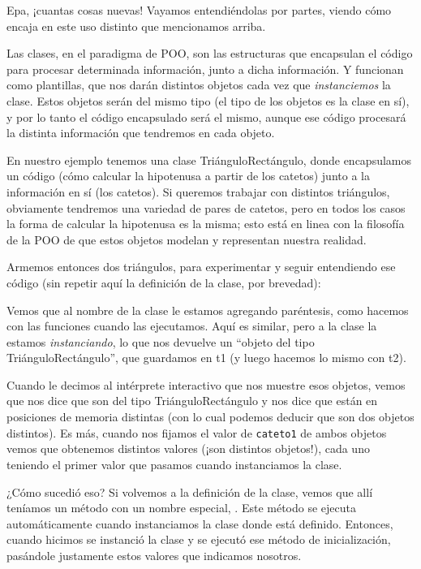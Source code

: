 
Epa, ¡cuantas cosas nuevas! Vayamos entendiéndolas por partes, viendo cómo encaja en este uso distinto que mencionamos arriba. 

Las clases, en el paradigma de POO, son las estructuras que encapsulan el código para procesar determinada información, junto a dicha información. Y funcionan como plantillas, que nos darán distintos objetos cada vez que \textit{instanciemos} la clase. Estos objetos serán del mismo tipo (el tipo de los objetos es la clase en sí), y por lo tanto el código encapsulado será el mismo, aunque ese código procesará la distinta información que tendremos en cada objeto.

En nuestro ejemplo tenemos una clase TriánguloRectángulo, donde encapsulamos un código (cómo calcular la hipotenusa a partir de los catetos) junto a la información en sí (los catetos). Si queremos trabajar con distintos triángulos, obviamente tendremos una variedad de pares de catetos, pero en todos los casos la forma de calcular la hipotenusa es la misma; esto está en linea con la filosofía de la POO de que estos objetos modelan y representan nuestra realidad.

Armemos entonces dos triángulos, para experimentar y seguir entendiendo ese código (sin repetir aquí la definición de la clase, por brevedad):


Vemos que al nombre de la clase le estamos agregando paréntesis, como hacemos con las funciones cuando las ejecutamos. Aquí es similar, pero a la clase la estamos \textit{instanciando}, lo que nos devuelve un ``objeto del tipo TriánguloRectángulo'', que guardamos en t1 (y luego hacemos lo mismo con t2).

Cuando le decimos al intérprete interactivo que nos muestre esos objetos, vemos que nos dice que son del tipo TriánguloRectángulo y nos dice que están en posiciones de memoria distintas (con lo cual podemos deducir que son dos objetos distintos). Es más, cuando nos fijamos el valor de \verb|cateto1| de ambos objetos vemos que obtenemos distintos valores (¡son distintos objetos!), cada uno teniendo el primer valor que pasamos cuando instanciamos la clase. 

¿Cómo sucedió eso? Si volvemos a la definición de la clase, vemos que allí teníamos un método con un nombre especial, . Este método se ejecuta automáticamente cuando instanciamos la clase donde está definido. Entonces, cuando hicimos  se instanció la clase y se ejecutó ese método de inicialización, pasándole justamente estos valores que indicamos nosotros.


